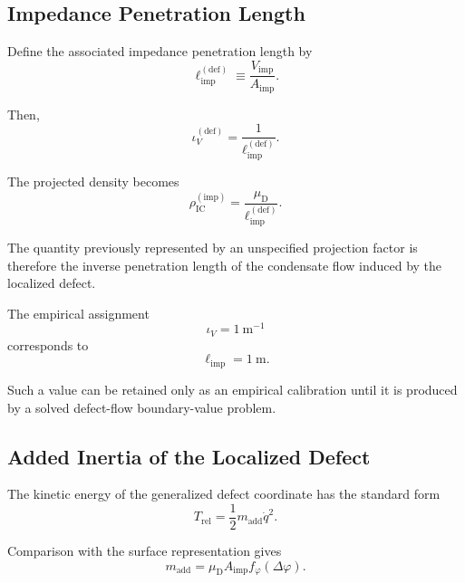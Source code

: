 \subsection{Impedance Penetration Length}

Define the associated impedance penetration length by
\begin{equation}
    \boxed{ \ell_{\mathrm{imp}}^{(\mathrm{def})} \equiv \frac{ V_{\mathrm{imp}} }{ A_{\mathrm{imp}} } }.
\end{equation}

Then,
\begin{equation}
    \boxed{ \iota_V^{(\mathrm{def})} = \frac{1}{ \ell_{\mathrm{imp}}^{(\mathrm{def})} } }.
\end{equation}

The projected density becomes
\begin{equation}
    \boxed{ \rho_{\mathrm{IC}}^{(\mathrm{imp})} = \frac{ \mu_{\mathrm{D}} }{ \ell_{\mathrm{imp}}^{(\mathrm{def})} } }.
\end{equation}

The quantity previously represented by an unspecified projection factor is therefore the inverse penetration length of the condensate flow induced by the localized defect.

The empirical assignment
\begin{equation}
    \iota_V = 1 \ \mathrm{m}^{-1}
\end{equation}
corresponds to
\begin{equation}
    \ell_{\mathrm{imp}} = 1 \ \mathrm{m}.
\end{equation}

Such a value can be retained only as an empirical calibration until it is produced by a solved defect-flow boundary-value problem.

\subsection{Added Inertia of the Localized Defect}

The kinetic energy of the generalized defect coordinate has the standard form
\begin{equation}
    T_{\mathrm{rel}} = \frac{1}{2} m_{\mathrm{add}} \dot{q}^2.
\end{equation}

Comparison with the surface representation gives
\begin{equation}
    \boxed{ m_{\mathrm{add}} = \mu_{\mathrm{D}} A_{\mathrm{imp}} f_{\varphi}(\Delta\varphi) }.
\end{equation}

